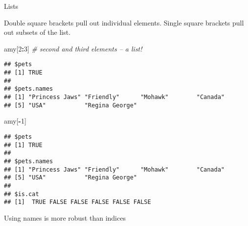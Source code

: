 \documentclass[ignorenonframetext,]{beamer}
\newenvironment{Shaded}{\begin{snugshade}}{\end{snugshade}}
\newcommand{\CommentTok}[1]{\textcolor[rgb]{0.56,0.35,0.01}{\textit{#1}}}
\newcommand{\DecValTok}[1]{\textcolor[rgb]{0.00,0.00,0.81}{#1}}
\newcommand{\NormalTok}[1]{#1}
\newcommand{\OperatorTok}[1]{\textcolor[rgb]{0.81,0.36,0.00}{\textbf{#1}}}
\begin{document}
\begin{frame}[fragile]{Lists}
\protect\hypertarget{lists-2}{}

Double square brackets pull out individual elements. Single square
brackets pull out subsets of the list.

\footnotesize

\begin{Shaded}
\begin{Highlighting}[]
\NormalTok{amy[}\DecValTok{2}\OperatorTok{:}\DecValTok{3}\NormalTok{] }\CommentTok{# second and third elements -- a list!}
\end{Highlighting}
\end{Shaded}

\begin{verbatim}
## $pets
## [1] TRUE
## 
## $pets.names
## [1] "Princess Jaws" "Friendly"      "Mohawk"        "Canada"       
## [5] "USA"           "Regina George"
\end{verbatim}

\begin{Shaded}
\begin{Highlighting}[]
\NormalTok{amy[}\OperatorTok{-}\DecValTok{1}\NormalTok{]}
\end{Highlighting}
\end{Shaded}

\begin{verbatim}
## $pets
## [1] TRUE
## 
## $pets.names
## [1] "Princess Jaws" "Friendly"      "Mohawk"        "Canada"       
## [5] "USA"           "Regina George"
## 
## $is.cat
## [1]  TRUE FALSE FALSE FALSE FALSE FALSE
\end{verbatim}

Using names is more robust than indices

\end{frame}
\end{document}
